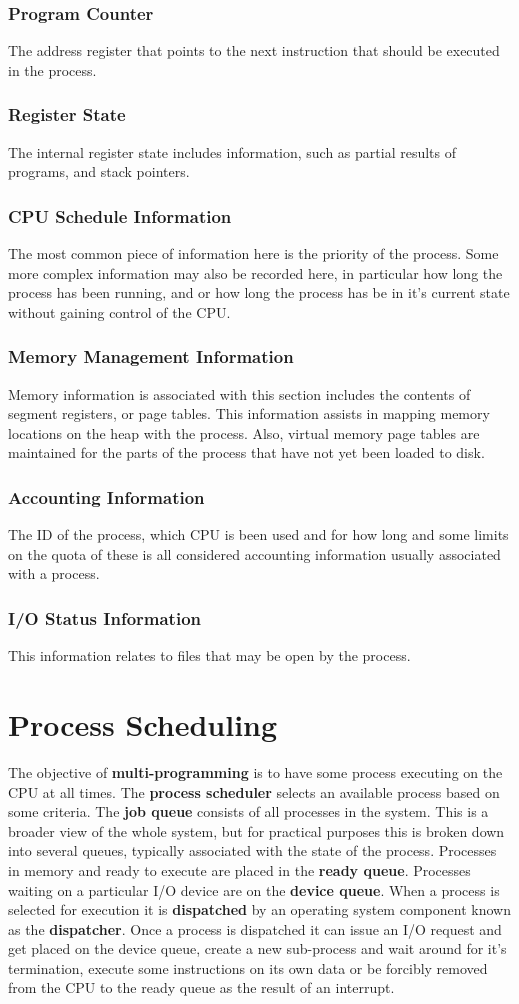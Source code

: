 \documentclass[10pt,a4paper]{article}
\begin{document}
\subsubsection{Program Counter}
The address register that points to the next instruction that should be executed in the process. 
\subsubsection{Register State}
The internal register state includes information, such as partial results of programs, and stack pointers.
\subsubsection{CPU Schedule Information}
The most common piece of information here is the priority of the process. Some more complex information may also be recorded here, in particular how long the process has been running, and or how long the process has be in it's current state without gaining control of the CPU.  
\subsubsection{Memory Management Information}
Memory information is associated with this section includes the contents of segment registers, or page tables. This information assists in mapping memory locations on the heap with the process. Also, virtual memory page tables are maintained for the parts of the process that have not yet been loaded to disk. 
\subsubsection{Accounting Information}
The ID of the process, which CPU is been used and for how long and some limits on the quota of these is all considered accounting information usually associated with a process. 
\subsubsection{I/O Status Information}
This information relates to files that may be open by the process. 
\section{Process Scheduling}
The objective of {\bf multi-programming} is to have some process executing on the CPU at all times. The {\bf process scheduler} selects an available process based on some criteria. The {\bf job queue} consists of all processes in the system. This is a broader view of the whole system, but for practical purposes this is broken down into several queues, typically associated with the state of the process. Processes in memory and ready to execute are placed in the {\bf ready queue}.  Processes waiting on a particular I/O device are on the {\bf device queue}. When a process is selected for execution it is {\bf dispatched} by an operating system component known as the {\bf dispatcher}. Once a process is dispatched it can issue an I/O request and get placed on the device queue, create a new sub-process and wait around for it's termination, execute some instructions on its own data or be forcibly removed from the CPU to the ready queue as the result of an interrupt. 
\end{document}
